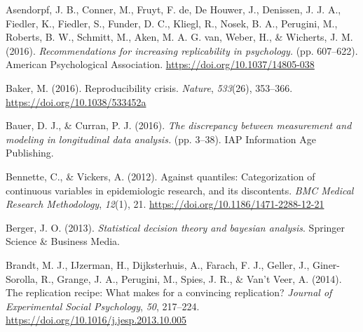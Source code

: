 \documentclass[
]{interact}
\newlength{\cslhangindent}
\newlength{\cslentryspacingunit} %
\newenvironment{CSLReferences}[2] %
    {%
  \setlength{\parindent}{0pt}
  \ifodd #1
  \let\oldpar\par
  \def\par{\hangindent=\cslhangindent\oldpar}
  \fi
  \setlength{\parskip}{#2\cslentryspacingunit}
 }%
 {}
\begin{document}
                    \small
                    
                    \hypertarget{refs}{}
                    \begin{CSLReferences}{1}{0}
                    \leavevmode{}%
                    Asendorpf, J. B., Conner, M., Fruyt, F. de, De Houwer, J., Denissen, J.
                    J. A., Fiedler, K., Fiedler, S., Funder, D. C., Kliegl, R., Nosek, B.
                    A., Perugini, M., Roberts, B. W., Schmitt, M., Aken, M. A. G. van,
                    Weber, H., \& Wicherts, J. M. (2016). \emph{Recommendations for
                      increasing replicability in psychology.} (pp. 607--622). American
                    Psychological Association. \url{https://doi.org/10.1037/14805-038}
                    
                    \leavevmode{}%
                    Baker, M. (2016). Reproducibility crisis. \emph{Nature}, \emph{533}(26),
                    353--366. \url{https://doi.org/10.1038/533452a}
                    
                    \leavevmode{}%
                    Bauer, D. J., \& Curran, P. J. (2016). \emph{The discrepancy between
                      measurement and modeling in longitudinal data analysis.} (pp. 3--38).
                    IAP Information Age Publishing.
                    
                    \leavevmode{}%
                    Bennette, C., \& Vickers, A. (2012). Against quantiles: Categorization
                    of continuous variables in epidemiologic research, and its discontents.
                    \emph{BMC Medical Research Methodology}, \emph{12}(1), 21.
                    \url{https://doi.org/10.1186/1471-2288-12-21}
                    
                    \leavevmode{}%
                    Berger, J. O. (2013). \emph{Statistical decision theory and bayesian
                      analysis}. Springer Science \& Business Media.
                    
                    \leavevmode{}%
                    Brandt, M. J., IJzerman, H., Dijksterhuis, A., Farach, F. J., Geller,
                    J., Giner-Sorolla, R., Grange, J. A., Perugini, M., Spies, J. R., \&
                      Van't Veer, A. (2014). The replication recipe: What makes for a
convincing replication? \emph{Journal of Experimental Social
Psychology}, \emph{50}, 217--224.
\url{https://doi.org/10.1016/j.jesp.2013.10.005}


\end{CSLReferences}
\end{document}
